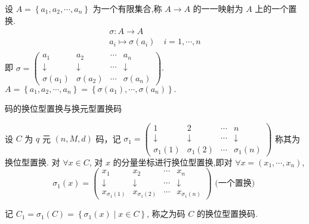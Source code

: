 设 $ A=\left\{a_{1}, a_{2}, \cdots, a_{n}\right\} $ 为一个有限集合,称 $ A \longrightarrow A $ 的一一映射为 $ A $ 上的一个置换.
$$
\begin{array}{l}
\sigma: A \longrightarrow A \\
a_{i} \longmapsto \sigma\left(a_{i}\right) \quad i=1, \cdots, n \\
\end{array}
$$
 即 $\sigma=\left(\begin{array}{cccc}
a_{1} & a_{2} & \cdots & a_{n} \\
\downarrow & \downarrow & \cdots & \downarrow \\
\sigma\left(a_{1}\right) & \sigma\left(a_{2}\right) & \cdots & \sigma\left(a_{n}\right)
\end{array}\right) $.
$A=\left\{a_{1}, a_{2}, \cdots, a_{n}\right\}=\left\{\sigma\left(a_{1}\right), \cdots, \sigma\left(a_{n}\right)\right\} .$


码的换位型置换与换元型置换码

\begin{definition}[换位型置换码]
    设 $ C $ 为 $ q $ 元 $ (n, M, d) $ 码，记 $ \sigma_{1}=\left(\begin{array}{cccc}1 & 2 & \cdots & n \\ \downarrow & \downarrow & \cdots & \downarrow \\ \sigma_{1}(1) & \sigma_{1}(2) & \cdots & \sigma_{1}(n)\end{array}\right) $ 称其为换位型置换. 对 $ \forall x \in C $, 对 $ x $ 的分量坐标进行换位型置换,即对 $ \forall x=\left(x_{1}, \cdots, x_{n}\right) $,
$$
\sigma_{1}(x)=\left(\begin{array}{cccc}
x_{1} & x_{2} & \cdots & x_{n} \\
\downarrow & \downarrow & \cdots & \downarrow \\
x_{\sigma_{1}(1)} & x_{\sigma_{1}(2)} & \cdots & x_{\sigma_{1}(n)}
\end{array}\right) \text { (一个置换) }
$$

记 $ C_{1}=\sigma_{1}(C)=\left\{\sigma_{1}(x) \mid x \in C\right\} $, 称之为码 $ C $ 的换位型置换码.
\end{definition}

